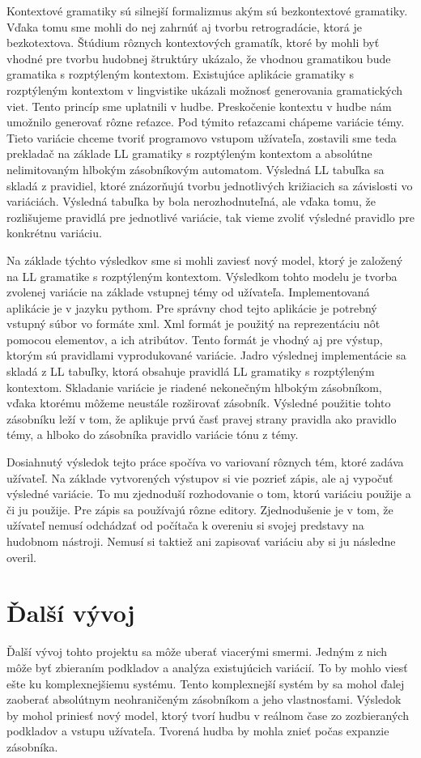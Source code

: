 Kontextové gramatiky sú silnejší formalizmus akým sú bezkontextové gramatiky. Vďaka tomu sme mohli do nej zahrnúť aj tvorbu retrogradácie, ktorá je bezkotextova. Štúdium rôznych kontextových gramatík, ktoré by mohli byť vhodné pre tvorbu hudobnej štruktúry ukázalo, že vhodnou gramatikou bude gramatika s rozptýleným kontextom. Existujúce aplikácie gramatiky s rozptýleným kontextom v lingvistike ukázali možnosť generovania gramatických viet. Tento princíp sme uplatnili v hudbe. Preskočenie kontextu v hudbe nám umožnilo generovať rôzne reťazce. Pod týmito reťazcami chápeme variácie témy. Tieto variácie chceme tvoriť programovo vstupom užívateľa, zostavili sme teda prekladač na základe LL gramatiky s rozptýleným kontextom a absolútne nelimitovaným hlbokým zásobníkovým automatom. Výsledná LL tabuľka sa skladá z pravidiel, ktoré znázorňujú tvorbu jednotlivých križiacich sa závislosti vo variáciách. Výsledná tabuľka by bola nerozhodnuteľná, ale vďaka tomu, že rozlišujeme pravidlá pre jednotlivé variácie, tak vieme zvoliť výsledné pravidlo pre konkrétnu variáciu.

Na základe týchto výsledkov sme si mohli zaviesť nový model, ktorý je založený na LL gramatike s rozptýleným kontextom. Výsledkom tohto modelu je tvorba zvolenej variácie na základe vstupnej témy od užívateľa. Implementovaná aplikácie je v jazyku pythom. Pre správny chod tejto aplikácie je potrebný vstupný súbor vo formáte xml. Xml formát je použitý na reprezentáciu nôt pomocou elementov, a ich atribútov. Tento formát je vhodný aj pre výstup, ktorým sú pravidlami vyprodukované variácie. Jadro výslednej implementácie sa skladá z LL tabuľky, ktorá obsahuje pravidlá LL gramatiky s rozptýleným kontextom. Skladanie variácie je riadené nekonečným hlbokým zásobníkom, vďaka ktorému môžeme neustále rozširovať zásobník. Výsledné použitie tohto zásobníku leží v tom, že aplikuje prvú časť pravej strany pravidla ako pravidlo témy, a hlboko do zásobníka pravidlo variácie tónu z témy.

Dosiahnutý výsledok tejto práce spočíva vo variovaní rôznych tém, ktoré zadáva užívateľ. Na základe vytvorených výstupov si vie pozrieť zápis, ale aj vypočuť výsledné variácie. To mu zjednoduší rozhodovanie o tom, ktorú variáciu použije a či ju použije. Pre zápis sa používajú rôzne editory. Zjednodušenie je v tom, že užívateľ nemusí odchádzať od počítača k overeniu si svojej predstavy na hudobnom nástroji. Nemusí si taktiež ani zapisovať variáciu aby si ju následne overil.

\section{Ďalší vývoj}
Ďalší vývoj tohto projektu sa môže uberať viacerými smermi. Jedným z nich môže byť zbieraním podkladov a analýza existujúcich variácií. To by mohlo viesť ešte ku komplexnejšiemu systému. Tento komplexnejší systém by sa mohol ďalej zaoberať absolútnym neohraničeným zásobníkom a jeho vlastnosťami. Výsledok by mohol priniesť nový model, ktorý tvorí hudbu v reálnom čase zo zozbieraných podkladov a vstupu užívateľa. Tvorená hudba by mohla znieť počas expanzie zásobníka.

